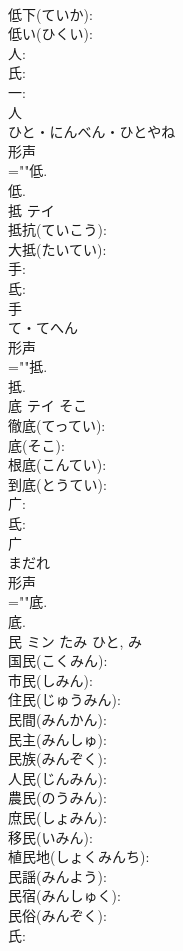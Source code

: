 \documentclass[8pt]{extreport}
\begin{document}
\begin{CJK}{UTF8}{min}
\\	低下(ていか): 
\\	低い(ひくい): 
\\	人: 
\\	氏: 
\\	一: 
\\	人	
\\	ひと・にんべん・ひとやね	
\\	形声 
\\	=""低.
\\	低.
\\	抵	テイ			
\\	抵抗(ていこう): 
\\	大抵(たいてい): 
\\	手: 
\\	氐: 
\\	手	
\\	て・てへん	
\\	形声 
\\	=""抵.
\\	抵.
\\	底	テイ	そこ		
\\	徹底(てってい): 
\\	底(そこ): 
\\	根底(こんてい): 
\\	到底(とうてい): 
\\	广: 
\\	氐: 
\\	广	
\\	まだれ	
\\	形声 
\\	=""底.
\\	底.
\\	民	ミン	たみ	ひと, み	
\\	国民(こくみん): 
\\	市民(しみん): 
\\	住民(じゅうみん): 
\\	民間(みんかん): 
\\	民主(みんしゅ): 
\\	民族(みんぞく): 
\\	人民(じんみん): 
\\	農民(のうみん): 
\\	庶民(しょみん): 
\\	移民(いみん): 
\\	植民地(しょくみんち): 
\\	民謡(みんよう): 
\\	民宿(みんしゅく): 
\\	民俗(みんぞく): 
\\	氏: 

\end{CJK}
\end{document}
